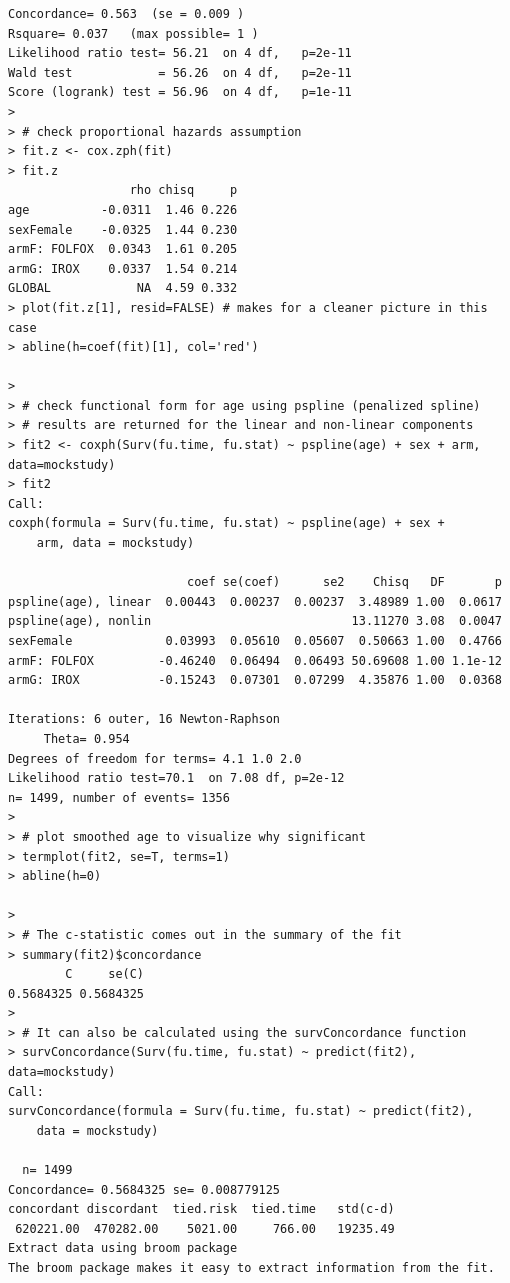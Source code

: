 \documentclass[
]{book}
\begin{document}
\begin{verbatim}
Concordance= 0.563  (se = 0.009 )
Rsquare= 0.037   (max possible= 1 )
Likelihood ratio test= 56.21  on 4 df,   p=2e-11
Wald test            = 56.26  on 4 df,   p=2e-11
Score (logrank) test = 56.96  on 4 df,   p=1e-11
> 
> # check proportional hazards assumption
> fit.z <- cox.zph(fit)
> fit.z
                 rho chisq     p
age          -0.0311  1.46 0.226
sexFemale    -0.0325  1.44 0.230
armF: FOLFOX  0.0343  1.61 0.205
armG: IROX    0.0337  1.54 0.214
GLOBAL            NA  4.59 0.332
> plot(fit.z[1], resid=FALSE) # makes for a cleaner picture in this case
> abline(h=coef(fit)[1], col='red')

> 
> # check functional form for age using pspline (penalized spline)
> # results are returned for the linear and non-linear components
> fit2 <- coxph(Surv(fu.time, fu.stat) ~ pspline(age) + sex + arm, data=mockstudy)
> fit2
Call:
coxph(formula = Surv(fu.time, fu.stat) ~ pspline(age) + sex + 
    arm, data = mockstudy)

                         coef se(coef)      se2    Chisq   DF       p
pspline(age), linear  0.00443  0.00237  0.00237  3.48989 1.00  0.0617
pspline(age), nonlin                            13.11270 3.08  0.0047
sexFemale             0.03993  0.05610  0.05607  0.50663 1.00  0.4766
armF: FOLFOX         -0.46240  0.06494  0.06493 50.69608 1.00 1.1e-12
armG: IROX           -0.15243  0.07301  0.07299  4.35876 1.00  0.0368

Iterations: 6 outer, 16 Newton-Raphson
     Theta= 0.954 
Degrees of freedom for terms= 4.1 1.0 2.0 
Likelihood ratio test=70.1  on 7.08 df, p=2e-12
n= 1499, number of events= 1356 
> 
> # plot smoothed age to visualize why significant
> termplot(fit2, se=T, terms=1)
> abline(h=0)

> 
> # The c-statistic comes out in the summary of the fit
> summary(fit2)$concordance
        C     se(C) 
0.5684325 0.5684325 
> 
> # It can also be calculated using the survConcordance function
> survConcordance(Surv(fu.time, fu.stat) ~ predict(fit2), data=mockstudy)
Call:
survConcordance(formula = Surv(fu.time, fu.stat) ~ predict(fit2), 
    data = mockstudy)

  n= 1499 
Concordance= 0.5684325 se= 0.008779125
concordant discordant  tied.risk  tied.time   std(c-d) 
 620221.00  470282.00    5021.00     766.00   19235.49 
Extract data using broom package
The broom package makes it easy to extract information from the fit.


\end{verbatim}
\end{document}
